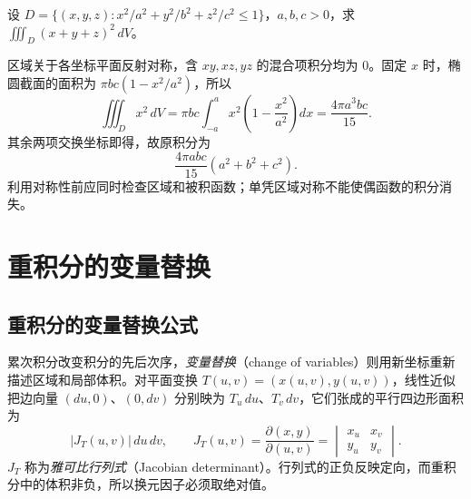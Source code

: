 \begin{example}
\label{ex:multiple-ellipsoid-second-moment}
设 $D=\{(x,y,z):x^2/a^2+y^2/b^2+z^2/c^2\leq1\}$，$a,b,c>0$，求 $\iiint_D(x+y+z)^2\,dV$。
\end{example}
\begin{solve}
区域关于各坐标平面反射对称，含 $xy,xz,yz$ 的混合项积分均为 $0$。固定 $x$ 时，椭圆截面的面积为 $\pi bc(1-x^2/a^2)$，所以
\[
    \iiint_Dx^2\,dV
    =\pi bc\int_{-a}^ax^2\left(1-\frac{x^2}{a^2}\right)dx
    =\frac{4\pi a^3bc}{15}.
\]
其余两项交换坐标即得，故原积分为
\[
    \frac{4\pi abc}{15}(a^2+b^2+c^2).
\]
利用对称性前应同时检查区域和被积函数；单凭区域对称不能使偶函数的积分消失。
\end{solve}

\section{重积分的变量替换}
\label{sec:change-of-variables-in-multiple-integrals}

\subsection{重积分的变量替换公式}
\label{subsec:change-of-variables-formula-for-multiple-integrals}

累次积分改变积分的先后次序，\emph{变量替换}（change of variables）则用新坐标重新描述区域和局部体积。对平面变换 $T(u,v)=(x(u,v),y(u,v))$，线性近似把边向量 $(du,0)$、$(0,dv)$ 分别映为 $T_u\,du$、$T_v\,dv$，它们张成的平行四边形面积为
\[
    |J_T(u,v)|\,du\,dv,\qquad
    J_T(u,v)=\frac{\partial(x,y)}{\partial(u,v)}
    =\begin{vmatrix}x_u&x_v\\y_u&y_v\end{vmatrix}.
\]
$J_T$ 称为\emph{雅可比行列式}（Jacobian determinant）。行列式的正负反映定向，而重积分中的体积非负，所以换元因子必须取绝对值。

